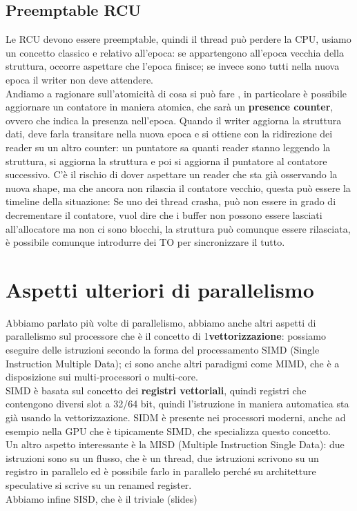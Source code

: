 \documentclass[12pt, oneside]{extbook}
\begin{document}
\subsection{Preemptable RCU}
Le RCU devono essere preemptable, quindi il thread può perdere la CPU, usiamo un concetto classico e relativo all'epoca: se appartengono all'epoca vecchia della struttura, occorre aspettare che l'epoca finisce; se invece sono tutti nella nuova epoca il writer non deve attendere.\\ Andiamo a ragionare sull'atomicità di cosa si può fare , in particolare è possibile aggiornare un contatore in maniera atomica, che sarà un \textbf{presence counter}, ovvero che indica la presenza nell'epoca. Quando il writer aggiorna la struttura dati, deve farla transitare nella nuova epoca e si ottiene con la ridirezione dei reader su un altro counter: un puntatore sa quanti reader stanno leggendo la struttura, si aggiorna la struttura e poi si aggiorna il puntatore al contatore successivo. C'è il rischio di dover aspettare un reader che sta già osservando la nuova shape, ma che ancora non rilascia il contatore vecchio, questa può essere la timeline della situazione:
Se uno dei thread crasha, può non essere in grado di decrementare il contatore, vuol dire che i buffer non possono essere lasciati all'allocatore ma non ci sono blocchi, la struttura può comunque essere rilasciata, è possibile comunque introdurre dei TO per sincronizzare il tutto.
\section{Aspetti ulteriori di parallelismo}
Abbiamo parlato più volte di parallelismo, abbiamo anche altri aspetti di parallelismo sul processore che è il concetto di 1\textbf{vettorizzazione}: possiamo eseguire delle istruzioni secondo la forma del processamento SIMD (Single Instruction Multiple Data); ci sono anche altri paradigmi come MIMD, che è a disposizione sui multi-processori o multi-core.\\ SIMD è basata sul concetto dei \textbf{registri vettoriali}, quindi registri che contengono diversi slot a 32/64 bit, quindi l'istruzione in maniera automatica sta già usando la vettorizzazione. SIDM è presente nei processori moderni, anche ad esempio nella GPU che è tipicamente SIMD, che specializza questo concetto. \\ Un altro aspetto interessante è la MISD (Multiple Instruction Single Data): due istruzioni sono su un flusso, che è un thread, due istruzioni scrivono su un registro in parallelo ed è possibile farlo in parallelo perché su architetture speculative si scrive su un renamed register.\\ Abbiamo infine SISD, che è il triviale (slides)
\end{document}
